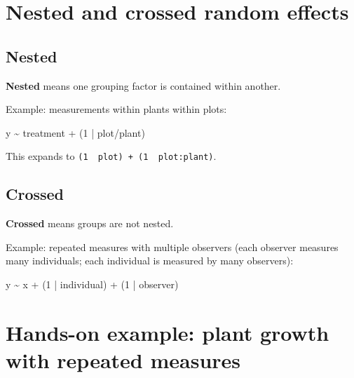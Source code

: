 \documentclass[
  letterpaper,
  8pt,
  a4paper]{book}
\newenvironment{Shaded}{\begin{snugshade}}{\end{snugshade}}
\newcommand{\DecValTok}[1]{\textcolor[rgb]{0.68,0.00,0.00}{#1}}
\newcommand{\NormalTok}[1]{\textcolor[rgb]{0.00,0.23,0.31}{#1}}
\newcommand{\SpecialCharTok}[1]{\textcolor[rgb]{0.37,0.37,0.37}{#1}}
\begin{document}
\section*{Nested and crossed random
effects}\label{nested-and-crossed-random-effects}


\subsection*{Nested}\label{nested}

\textbf{Nested} means one grouping factor is contained within another.

Example: measurements within plants within plots:

\begin{Shaded}
\begin{Highlighting}[]
\NormalTok{y }\SpecialCharTok{\textasciitilde{}}\NormalTok{ treatment }\SpecialCharTok{+}\NormalTok{ (}\DecValTok{1} \SpecialCharTok{|}\NormalTok{ plot}\SpecialCharTok{/}\NormalTok{plant)}
\end{Highlighting}
\end{Shaded}

This expands to
\texttt{(1\ \textbar{}\ plot)\ +\ (1\ \textbar{}\ plot:plant)}.

\subsection*{Crossed}\label{crossed}

\textbf{Crossed} means groups are not nested.

Example: repeated measures with multiple observers (each observer
measures many individuals; each individual is measured by many
observers):

\begin{Shaded}
\begin{Highlighting}[]
\NormalTok{y }\SpecialCharTok{\textasciitilde{}}\NormalTok{ x }\SpecialCharTok{+}\NormalTok{ (}\DecValTok{1} \SpecialCharTok{|}\NormalTok{ individual) }\SpecialCharTok{+}\NormalTok{ (}\DecValTok{1} \SpecialCharTok{|}\NormalTok{ observer)}
\end{Highlighting}
\end{Shaded}

\section*{Hands-on example: plant growth with repeated
measures}\label{hands-on-example-plant-growth-with-repeated-measures}
\end{document}
